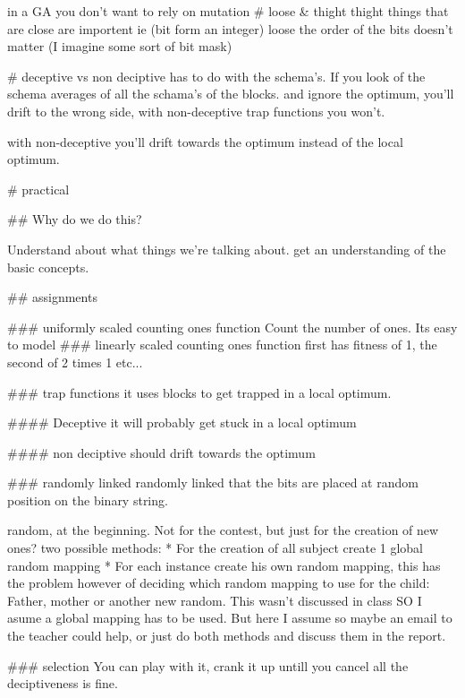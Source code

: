 in a GA you don't want to rely on mutation
# loose & thight
thight things that are close are importent ie (bit form an integer)
loose the order of the bits doesn't matter (I imagine some sort of bit mask)

# deceptive vs non deciptive
has to do with the schema's. If you look of the schema averages of all the
schama's of the blocks. and ignore the optimum, you'll drift to the wrong
side, with non-deceptive trap functions you won't.

with non-deceptive you'll drift towards the optimum instead of the local
optimum.

# practical

## Why do we do this?

Understand about what things we're talking about. get an understanding of
the basic concepts.

## assignments

### uniformly scaled counting ones function
Count the number of ones. Its easy to model
### linearly scaled counting ones function
first has fitness of 1, the second of 2 times 1 etc...

### trap functions
it uses blocks to get trapped in a local optimum.

#### Deceptive
it will probably get stuck in a local optimum

#### non deciptive
should drift towards the optimum

### randomly linked
randomly linked that the bits are placed at random position on the binary
string.

random, at the beginning. Not for the contest, but just for the creation of
new ones?
two possible methods:
	* For the creation of all subject create 1 global random mapping
	* For each instance create his own random mapping, this has the
	problem however of deciding which random mapping to use for the child:
		Father, mother or another new random.
This wasn't discussed in class SO I asume a global mapping has to be used.
But here I assume so maybe an email to the teacher could help, or just do
both methods and discuss them in the report.

### selection
You can play with it, crank it up untill you cancel all the deciptiveness is
fine.
